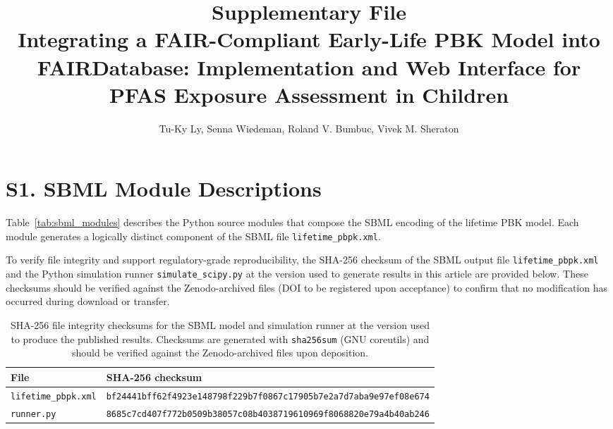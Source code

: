 \documentclass[12pt]{article}
\title{\textbf{Supplementary File}\\[0.5em]
\large Integrating a FAIR-Compliant Early-Life PBK Model into
FAIRDatabase: Implementation and Web Interface for PFAS Exposure
Assessment in Children}
\author{Tu-Ky Ly, Senna Wiedeman, Roland V. Bumbuc, Vivek M. Sheraton}
\date{}
\begin{document}
\maketitle
\tableofcontents
\newpage

\section*{S1. SBML Module Descriptions}

Table~\ref{tab:sbml_modules} describes the Python source modules that
compose the SBML encoding of the lifetime PBK model. Each module
generates a logically distinct component of the SBML file
\texttt{lifetime\_pbpk.xml}.

To verify file integrity and support regulatory-grade reproducibility, the SHA-256 checksum of the SBML output file \texttt{lifetime\_pbpk.xml} and the Python simulation runner \texttt{simulate\_scipy.py} at the version used to generate results in this article are provided below. These checksums should be verified against the Zenodo-archived files (DOI to be registered upon acceptance) to confirm that no modification has occurred during download or transfer.

\begin{table}[h]
\centering
\caption{SHA-256 file integrity checksums for the SBML model and simulation runner at the version used to produce the published results. Checksums are generated with \texttt{sha256sum} (GNU coreutils) and should be verified against the Zenodo-archived files upon deposition.}
\label{tab:checksums}
\begin{tabular}{p{4cm} p{10cm}}
\toprule
\textbf{File} & \textbf{SHA-256 checksum} \\
\midrule
\texttt{lifetime\_pbpk.xml} & \texttt{bf24441bff62f4923e148798f229b7f0867c17905b7e2a7d7aba9e97ef08e674} \\
\texttt{runner.py} & \texttt{8685c7cd407f772b0509b38057c08b4038719610969f8068820e79a4b40ab246} \\
\bottomrule
\end{tabular}
\end{table}
\end{document}

